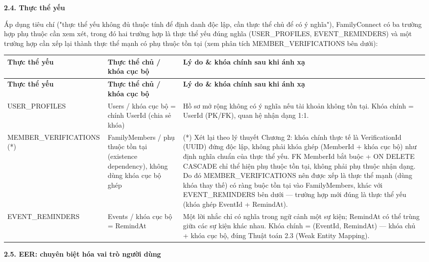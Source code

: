 {}
{\Large\bfseries 2.4. Thực thể yếu}\par\vspace{0.7em}

Áp dụng tiêu chí ("thực thể yếu không đủ thuộc tính để định danh độc lập, cần thực thể chủ để có ý nghĩa"), FamilyConnect có ba trường hợp phụ thuộc cần xem xét, trong đó hai trường hợp là thực thể yếu đúng nghĩa (USER\_PROFILES, EVENT\_REMINDERS) và một trường hợp cần xếp lại thành thực thể mạnh có phụ thuộc tồn tại (xem phân tích MEMBER\_VERIFICATIONS bên dưới):

\begin{longtable}{|p{}|p{}|p{}|}
\hline
\textbf{Thực thể yếu} & \textbf{Thực thể chủ / khóa cục bộ} & \textbf{Lý do \& khóa chính sau khi ánh xạ} \\ \hline
\endfirsthead
\hline
\textbf{Thực thể yếu} & \textbf{Thực thể chủ / khóa cục bộ} & \textbf{Lý do \& khóa chính sau khi ánh xạ} \\ \hline
\endhead
USER\_PROFILES & Users / khóa cục bộ = chính UserId (chia sẻ khóa) & Hồ sơ mở rộng không có ý nghĩa nếu tài khoản không tồn tại. Khóa chính = UserId (PK/FK), quan hệ nhận dạng 1:1. \\ \hline
MEMBER\_VERIFICATIONS (*) & FamilyMembers / phụ thuộc tồn tại (existence dependency), không dùng khóa cục bộ ghép & (*) Xét lại theo lý thuyết Chương 2: khóa chính thực tế là VerificationId (UUID) đứng độc lập, không phải khóa ghép (MemberId + khóa cục bộ) như định nghĩa chuẩn của thực thể yếu. FK MemberId bắt buộc + ON DELETE CASCADE chỉ thể hiện phụ thuộc tồn tại, không phải phụ thuộc nhận dạng. Do đó MEMBER\_VERIFICATIONS nên được xếp là thực thể mạnh (dùng khóa thay thế) có ràng buộc tồn tại vào FamilyMembers, khác với EVENT\_REMINDERS bên dưới — trường hợp mới đúng là thực thể yếu (khóa ghép EventId + RemindAt). \\ \hline
EVENT\_REMINDERS & Events / khóa cục bộ = RemindAt & Một lời nhắc chỉ có nghĩa trong ngữ cảnh một sự kiện; RemindAt có thể trùng giữa các sự kiện khác nhau. Khóa chính = (EventId, RemindAt) — khóa chủ + khóa cục bộ, đúng Thuật toán 2.3 (Weak Entity Mapping). \\ \hline
\end{longtable}


{}
{\Large\bfseries 2.5. EER: chuyên biệt hóa vai trò người dùng}\par\vspace{0.7em}

